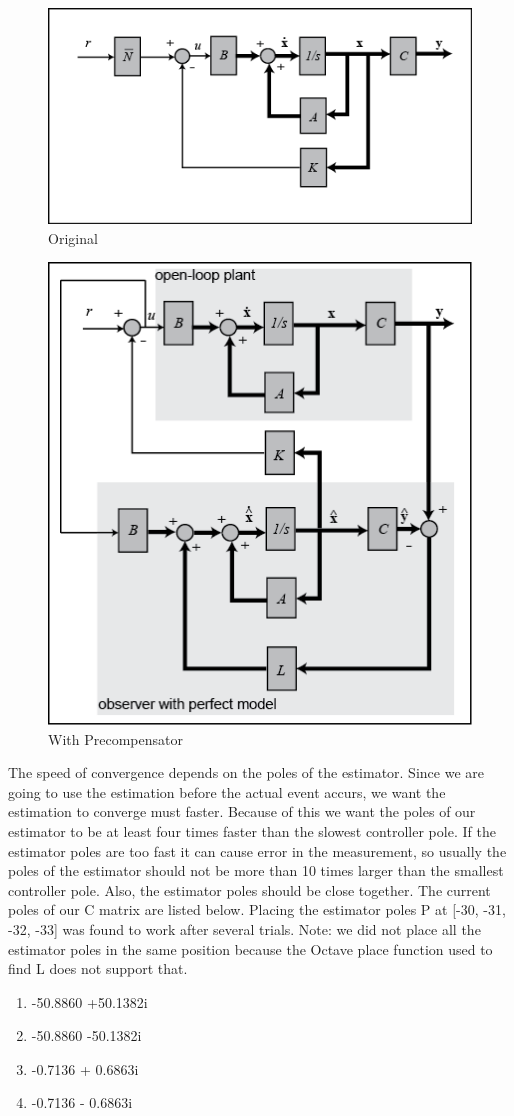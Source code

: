 \documentclass{article}
\begin{document}
\begin{figure}[!htb]
\centering
  \includegraphics[width=.7\linewidth]{blockd}
  \caption{Original}
  \label{bd}
  \end{figure}

\begin{figure}[!htb]
\centering
  \includegraphics[width=.6\linewidth]{observer_blockd}
  \caption{With Precompensator}
  \label{bd2}
\end{figure}


\clearpage

The speed of convergence depends on the poles of the estimator. Since we are going to use the estimation before the actual event accurs, we want the estimation to converge must faster. Because of this we want the poles of our estimator to be at least four times faster than the slowest controller pole. If the estimator poles are too fast it can cause error in the measurement, so usually the poles of the estimator should not be more than 10 times larger than the smallest controller pole. Also, the estimator poles should be close together. The current poles of our C matrix are listed below. Placing the estimator poles P at [-30, -31, -32, -33] was found to work after several trials. Note: we did not place all the estimator poles in the same position because the Octave place function used to find L does not support that.
\begin{enumerate}
  \item  -50.8860 +50.1382i
  \item -50.8860 -50.1382i
  \item -0.7136 + 0.6863i
  \item -0.7136 - 0.6863i
\end{enumerate}
\end{document}
